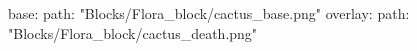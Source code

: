 base:
  path: "Blocks/Flora_block/cactus_base.png"
overlay:
  path: "Blocks/Flora_block/cactus_death.png"